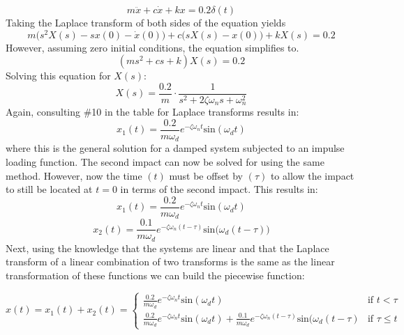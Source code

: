 \documentclass[12pt,a4paper]{article}
\begin{document}
\begin{equation}
m\ddot{x} +c\dot{x} +kx =0.2 \delta(t)
\end{equation}
Taking the Laplace transform of both sides of the equation yields 
\begin{equation}
m\big(s^2X(s)-sx(0) - \dot{x}(0)\big) + c\big(sX(s)-x(0)\big) +kX(s) = 0.2
\end{equation}
However, assuming zero initial conditions, the equation simplifies to. 
\begin{equation}
(ms^2 + cs +k)X(s) = 0.2
\end{equation}
Solving this equation for $X(s)$:
\begin{equation}
X(s) = \frac{0.2}{m} \cdot \frac{1}{s^2 + 2 \zeta \omega_n s + \omega_n^2}
\end{equation}
Again, consulting \#10 in the table for Laplace transforms results in:
\begin{equation}
x_1(t) = \frac{0.2}{m \omega_d} e^{-\zeta \omega_n t} \text{sin}(\omega_dt)
\end{equation}
where this is the general solution for a damped system subjected to an impulse loading function. The second impact can now be solved for using the same method. However, now the time $(t)$ must be offset by $(\tau)$ to allow the impact to still be located at $t=0$ in terms of the second impact. This results in:
\begin{equation}
	x_1(t) = \frac{0.2}{m \omega_d} e^{-\zeta \omega_n t} \text{sin}(\omega_dt)
\end{equation}
\begin{equation}
	x_2(t) = \frac{0.1}{m \omega_d} e^{-\zeta \omega_n (t-\tau)} \text{sin}\big(\omega_d(t-\tau)\big)
\end{equation}
Next, using the knowledge that the systems are linear and that the Laplace transform of a linear combination of two transforms is the same as the linear transformation of these functions we can build the piecewise function:

\[
  x(t) = x_1(t) + x_2(t) =
  \begin{cases}
\frac{0.2}{m \omega_d} e^{-\zeta \omega_n t} \text{sin}(\omega_dt) & \text{if } t < \tau \\
\frac{0.2}{m \omega_d} e^{-\zeta \omega_n t} \text{sin}(\omega_dt)  + \frac{0.1}{m \omega_d} e^{-\zeta \omega_n (t-\tau)} \text{sin}(\omega_d(t-\tau) & \text{if } \tau \leq t 
  \end{cases}
\]
\end{document}
